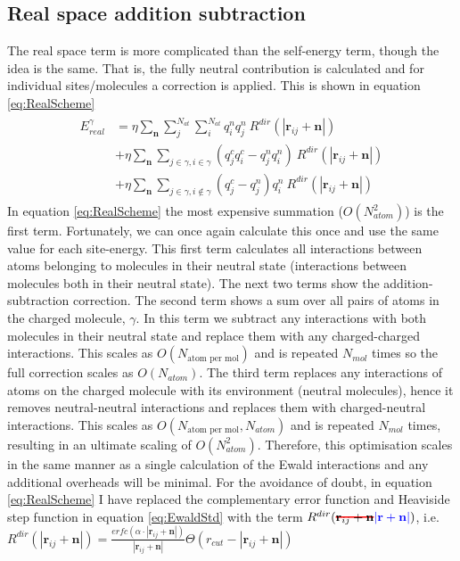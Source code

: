 \subsection{Real space addition subtraction}
The real space term is more complicated than the self-energy term, though the idea is the same. That is, the fully neutral contribution is calculated and for individual sites/molecules a correction is applied. This is shown in equation \eqref{eq:RealScheme}
\begin{align}
  \begin{split}
	  E^{\gamma}_{real} &= \eta \sum_{\mathbf{n}} \sum_{j}^{N_{at}} \sum_{i}^{N_{at}} q^{n}_i q^{n}_j  \ R^{dir}(|\mathbf{r}_{ij} + \mathbf{n}|) \\
	  &+ \eta \sum_{\mathbf{n}} \sum_{j \in \gamma, i \in \gamma} (q_j^c q_i^c - q_j^n q_i^n) \ R^{dir}(|\mathbf{r}_{ij} + \mathbf{n}|) \\
	  &+ \eta \sum_{\mathbf{n}} \sum_{j \in \gamma, i \not\in \gamma} (q_j^c - q_j^n)q_i^n \ R^{dir}(|\mathbf{r}_{ij} + \mathbf{n}|) 
  \end{split}
  \label{eq:RealScheme}
\end{align}
In equation \eqref{eq:RealScheme} the most expensive summation ($O(N_{atom}^2)$) is the first term. Fortunately, we can once again calculate this once and use the same value for each site-energy. This first term calculates all interactions between atoms belonging to molecules in their neutral state (interactions between molecules both in their neutral state). The next two terms show the addition-subtraction correction. The second term shows a sum over all pairs of atoms in the charged molecule, $\gamma$. In this term we subtract any interactions with both molecules in their neutral state and replace them with any charged-charged interactions. This scales as $O(N_{\text{atom per mol}})$ and is repeated $N_{mol}$ times so the full correction scales as $O(N_{atom})$. The third term replaces any interactions of atoms on the charged molecule with its environment (neutral molecules), hence it removes neutral-neutral interactions and replaces them with charged-neutral interactions. This scales as $O(N_{\text{atom per mol}}, N_{atom})$ and is repeated $N_{mol}$ times, resulting in an ultimate scaling of $O(N_{atom}^2)$. Therefore, this optimisation scales in the same manner as a single calculation of the Ewald interactions and any additional overheads will be minimal. For the avoidance of doubt, in equation \eqref{eq:RealScheme} I have replaced the complementary error function and Heaviside step function in equation \eqref{eq:EwaldStd} with the term $R^{dir}(\mremove{\mathbf{r}_{ij} + \mathbf{n}}\madd{|\mathbf{r} + \mathbf{n}|})$, i.e. $R^{dir}(|\mathbf{r}_{ij} + \mathbf{n}|) = \frac{erfc\left( \alpha \cdot |\mathbf{r}_{ij} + \mathbf{n}|\right)}{|\mathbf{r}_{ij} + \mathbf{n}|}              \Theta\left( r_{cut} - |\mathbf{r}_{ij} + \mathbf{n}| \right)$


